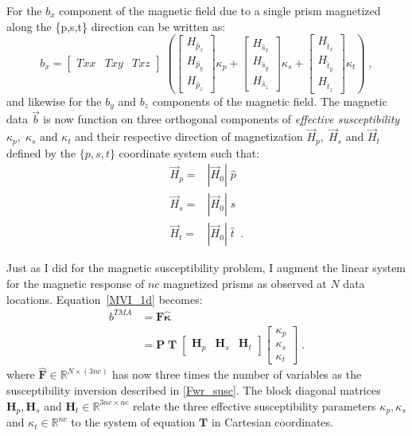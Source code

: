 For the $b_x$ component of the magnetic field due to a single prism magnetized along the \{p,s,t\} direction can be written as:
\begin{equation}
 b_x = 
\begin{bmatrix}
 Txx  &  Txy & Txz
\end{bmatrix}\;\left(
\begin{bmatrix}
H_{\hat p_x}\\H_{\hat p_y}\\H_{ \hat p_z}
\end{bmatrix} \kappa_p +
\begin{bmatrix}
H_{\hat s_x}\\H_{\hat s_y}\\H_{ \hat s_z}
\end{bmatrix} \kappa_s + 
\begin{bmatrix}
H_{\hat t_x}\\H_{\hat t_y}\\H_{ \hat t_z}
\end{bmatrix} \kappa_t \right) \;,
\end{equation}
and likewise for the $b_y$ and $b_z$ components of the magnetic field.
The magnetic data $\vec {b}$ is now function on three orthogonal components of \emph{effective susceptibility} $\kappa_p, \;\kappa_s$ and $\kappa_t$ and their respective direction of magnetization ${\vec{ H}}_p, \; {\vec{ H}}_s$ and ${\vec{ H}}_t$ defined by the $\{p,s,t\}$ coordinate system such that:
\begin{equation}
\begin{split}
		{\vec{ H}}_p =&  |\vec H_0 |\;  \hat{p}\; \\
		{\vec{ H}}_s =&  |\vec H_0 |\;  \hat{s}\;\\
		{\vec{ H}}_t =&  |\vec H_0 |\; \hat{t}\;\;.
\end{split}
\end{equation}

Just as I did for the magnetic susceptibility problem, I augment the linear system for the magnetic response  of $nc$ magnetized prisms as observed at $N$ data locations.  Equation~\ref{MVI_1d} becomes:
\begin{equation}
\begin{split}
	{b}^{TMA} &= \mathbf{ F} \boldsymbol{\hat \kappa} \\
			&= \mathbf{P\;T}\;\begin{bmatrix} \mathbf{H}_p & \mathbf{H}_s & \mathbf{H}_t \end{bmatrix}
	\begin{bmatrix}
	{\kappa_p} \\
	{\kappa_s} \\
	{\kappa_t} 
	\end{bmatrix} \;.
\end{split}
\end{equation}
where $\mathbf{\hat F} \in \mathbb{R}^{N \times (3nc)}$ has now three times the number of variables as the susceptibility inversion described in \ref{Fwr_susc}. The block diagonal matrices $ \mathbf{H}_p,  \mathbf{H}_s$ and  $\mathbf{H}_t \in \mathbb R^{3nc \times nc}$ relate the three effective susceptibility parameters $\kappa_p, \kappa_s$  and $\kappa_t \in \mathbb{R}^{nc}$ to the system of equation $\mathbf{T}$ in Cartesian coordinates. 


